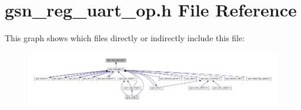 \hypertarget{a00574}{
\section{gsn\_\-reg\_\-uart\_\-op.h File Reference}
\label{a00574}
}
This graph shows which files directly or indirectly include this file:
\nopagebreak
\begin{figure}[H]
\begin{center}
\leavevmode
\includegraphics[width=400pt]{a00811}
\end{center}
\end{figure}
